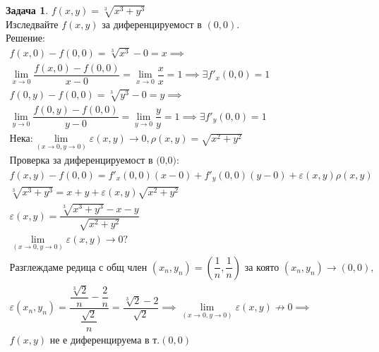 \documentclass[a4paper,fleqn,12pt]{article}
\theoremstyle{definition}
\newtheorem{task}{Задача}[subsection]
\begin{document}
\begin{task}
$f(x,y) = \sqrt[3]{x^3 + y^3}$\\
Изследвайте $f(x,y)$ за диференцируемост в $(0,0)$.\\
Решение: 
\begin{gather*}
f(x,0) - f(0,0) = \sqrt[3]{x^3} - 0 = x\implies \\
\lim\limits_{x \to 0} \dfrac{f(x,0) - f(0,0)}{x - 0}= \lim\limits_{x \to 0} \dfrac{x}{x} = 1 \implies \exists f'_x(0,0) = 1\\
f(0,y) - f(0,0) = \sqrt[3]{y^3} - 0 = y \implies \\
\lim\limits_{y \to 0}\dfrac{f(0,y) - f(0,0)}{y - 0} = \lim\limits_{y \to 0} \dfrac{y}{y} = 1 \implies \exists f'_y(0,0) = 1\\
\text{Нека:}
\lim\limits_ {(x \to 0, y \to 0)} \varepsilon (x,y) \to 0, \rho (x,y) = \sqrt{x^2 + y^2}\\
\text{Проверка за диференцируемост в (0,0):}\\
f(x,y) - f(0,0)  = f'_x(0,0)(x - 0) + f'_y(0,0)(y-0) + \varepsilon (x,y) \rho (x,y) \\
\sqrt[3]{x^3 + y^3} = x + y + \varepsilon (x,y) \sqrt{x^2 + y^2} \\
\varepsilon (x,y) = \dfrac{\sqrt[3]{x^3 + y^3} - x - y}{ \sqrt{x^2 + y^2}} \\
\lim\limits_ {(x \to 0, y \to 0)} \varepsilon (x,y) \to 0?\\
\text{Разглеждаме редица с общ член } (x_n, y_n) = \left( \dfrac{1}{n}, \dfrac{1}{n} \right) \text{ за която } (x_n, y_n) \to (0,0), \\
\varepsilon (x_n, y_n) = \dfrac{\dfrac{\sqrt[3]{2}}{n} - \dfrac{2}{n}}{\dfrac{\sqrt{2}}{n}} = \dfrac{\sqrt[3]{2} - 2}{\sqrt{2}} \implies \lim\limits_ {(x \to 0, y \to 0)} \varepsilon (x,y) \not\to 0 \implies \\
 f(x,y) \text{ не е диференцируема в т.} (0,0)
\end{gather*}
\end{task}
\end{document}
